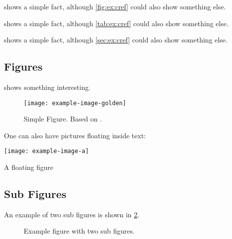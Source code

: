 \documentclass[runningheads,a4paper,english]{llncs}[2022/01/12]
\begin{document}
\begin{ltgexample}
 shows a simple fact, although \cref{fig:ex:cref} could also show something else.

 shows a simple fact, although \cref{tab:ex:cref} could also show something else.

 shows a simple fact, although \cref{sec:ex:cref} could also show something else.
\end{ltgexample}

\subsection{Figures}

\begin{ltgexample}
 shows something interesting.

\begin{figure}
  \centering
  \texttt{[image: example-image-golden]}
  \caption[Simple Figure]{Simple Figure. Based on \citet{mwe}.}
  \label{fig:label}
\end{figure}
\end{ltgexample}

One can also have pictures floating inside text:
\clearpage

\begin{ltgexample}
\begin{floatingfigure}{.33\linewidth}
\texttt{[image: example-image-a]}
\caption{A floating figure}
\end{floatingfigure}
\lipsum[2]
\end{ltgexample}

\subsection{Sub Figures}

An example of two sub figures is shown in \cref{fig:two_sub_figures}.

\begin{ltgexample}
\begin{figure}[!b]
    \centering
  \hfil
  \caption{Example figure with two sub figures.}
  \label{fig:two_sub_figures}
\end{figure}
\end{ltgexample}
\end{document}
